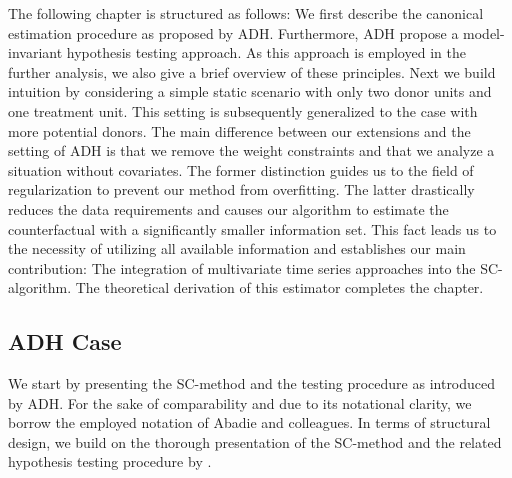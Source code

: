The following chapter is structured as follows: We first describe the canonical estimation procedure as proposed by \ac{ADH}. Furthermore, \ac{ADH} propose a model-invariant hypothesis testing approach. As this approach is employed in the further analysis, we also give a brief overview of these principles. Next we build intuition by considering a simple static scenario with only two donor units and one treatment unit. This setting is subsequently generalized to the case with more potential donors. The main difference between our extensions and the setting of \ac{ADH} is that we remove the weight constraints and that we analyze a situation without covariates. The former distinction guides us to the field of regularization to prevent our method from overfitting. The latter drastically reduces the data requirements and causes our algorithm to estimate the counterfactual with a significantly smaller information set. This fact leads us to the necessity of utilizing all available information and establishes our main contribution: The integration of  multivariate time series approaches into the \ac{SC}-algorithm. The theoretical derivation of this estimator completes the chapter.

\subsection{ADH Case}
We start by presenting the \ac{SC}-method and the testing procedure as introduced by \ac{ADH}. For the sake of comparability and due to its notational clarity, we borrow the employed notation of Abadie and colleagues. In terms of structural design, we build on the thorough presentation of the \ac{SC}-method and the related hypothesis testing procedure by \cite{firpo:2018}.


